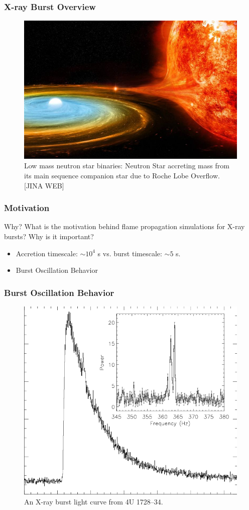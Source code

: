 \documentclass[
	11pt, %
]{beamer}
\begin{document}
\begin{frame}
    \frametitle{X-ray Burst Overview}
    
    \begin{figure}
        \centering
        \includegraphics[width=0.6\linewidth]{x-ray-burst.jpg}
        \caption{Low mass neutron star binaries: Neutron Star accreting mass from its main sequence companion star due to Roche Lobe Overflow. [JINA WEB]}
    \end{figure}
    
\end{frame}

\begin{frame}
    \frametitle{Motivation}
    
    \begin{block}{Why?}
        \large What is the motivation behind flame propagation simulations for X-ray bursts? Why is it important?
    \end{block}
    
    \begin{itemize}
        \item Accretion timescale: $\sim 10^4$ s vs. burst timescale: $\sim 5$ s.
        \item Burst Oscillation Behavior
    \end{itemize}
\end{frame}


\begin{frame}
    \frametitle{Burst Oscillation Behavior}
      
      \begin{figure}
        \centering
        \includegraphics[width=0.6\linewidth]{x-ray-burst-lightcurve.png}
        \caption{An X-ray burst light curve from 4U 1728–34. \cite{strohmayer_2009}}
    \end{figure}
  
\end{frame}
\end{document}
